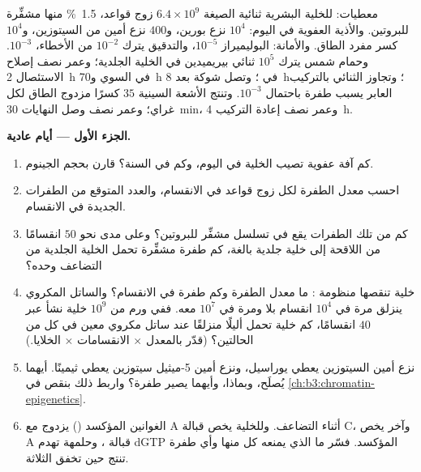 \begin{problem}
\label{pb:b3:dna-repair:1}
معطيات: للخلية البشرية ثنائية الصيغة $6.4\times 10^{9}$ زوج قواعد،
\qty{1.5}{\%} منها مشفِّرة للبروتين. والأذية العفوية في اليوم:
$10^{4}$ نزع بورين، و$400$ نزع أمين من السيتوزين، و$10^{4}$ كسر
مفرد الطاق. والأمانة: البوليميراز $10^{-5}$، والتدقيق يترك
$10^{-2}$ من الأخطاء،  $10^{-3}$. وحمام شمس يترك
$10^{5}$ ثنائي بيريميدين في الخلية الجلدية؛ وعمر نصف إصلاح
الاستئصال \qty{2}{h} في السوي و\qty{70}{h} في ؛ وتصل شوكة بعد \qty{8}{h}؛ وتجاوز الثنائي بالتركيب العابر
يسبب طفرة باحتمال $10^{-3}$. وتنتج الأشعة السينية
$35$ كسرًا مزدوج الطاق لكل غراي؛ وعمر نصف وصل النهايات \qty{30}{min}،
وعمر نصف إعادة التركيب \qty{4}{h}.

\medskip
\noindent\textbf{الجزء الأول --- أيام عادية.}
\begin{enumerate}
  \item كم آفة عفوية تصيب الخلية في اليوم، وكم في السنة؟ قارن
        بحجم الجينوم.
  \item احسب معدل الطفرة لكل زوج قواعد في الانقسام، والعدد
        المتوقع من الطفرات الجديدة في الانقسام.
  \item كم من تلك الطفرات يقع في تسلسل مشفِّر للبروتين؟ وعلى مدى
        نحو $50$ انقسامًا من اللاقحة إلى خلية جلدية بالغة، كم طفرة
        مشفِّرة تحمل الخلية الجلدية من التضاعف وحده؟
  \item خلية تنقصها منظومة : ما معدل الطفرة وكم
        طفرة في الانقسام؟ والساتل المكروي ينزلق مرة في $10^{4}$
        انقسام بلا  ومرة في $10^{7}$ معه.
        ففي ورم من $10^{9}$ خلية نشأ عبر $40$
        انقسامًا، كم خلية تحمل أليلًا منزلقًا عند ساتل مكروي معين
        في كل من الحالتين؟ (قدّر بالمعدل $\times$
        الانقسامات $\times$ الخلايا.)
  \item نزع أمين السيتوزين يعطي يوراسيل، ونزع أمين 5-ميثيل
        سيتوزين يعطي ثيمينًا. أيهما يُصلَح، وبماذا، وأيهما يصير
        طفرة؟ واربط ذلك بنقص  في
        \cref{ch:b3:chromatin-epigenetics}.
  \item الغوانين المؤكسد () يزدوج مع A أثناء التضاعف.
        وللخلية  يخص  قبالة C، وآخر
        يخص A قبالة ، وحلمهة تهدم dGTP المؤكسد.
        فسّر ما الذي يمنعه كل منها وأي طفرة تنتج حين تخفق
        الثلاثة.
\end{enumerate}


\end{problem}
